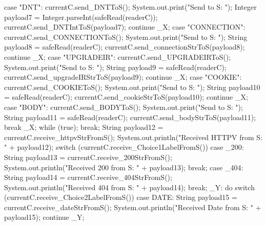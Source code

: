 \begin{code}
{{{{{                        case "DNT":
                            currentC.send_DNTToS();
                            System.out.print("Send to S: ");
                            Integer payload7 = Integer.parseInt(safeRead(readerC));
                            currentC.send_DNTIntToS(payload7);
                            continue _X;
                        case "CONNECTION":
                            currentC.send_CONNECTIONToS();
                            System.out.print("Send to S: ");
                            String payload8 = safeRead(readerC);
                            currentC.send_connectionStrToS(payload8);
                            continue _X;
                        case "UPGRADEIR":
                            currentC.send_UPGRADEIRToS();
                            System.out.print("Send to S: ");
                            String payload9 = safeRead(readerC);
                            currentC.send_upgradeIRStrToS(payload9);
                            continue _X;
                        case "COOKIE":
                            currentC.send_COOKIEToS();
                            System.out.print("Send to S: ");
                            String payload10 = safeRead(readerC);
                            currentC.send_cookieStrToS(payload10);
                            continue _X;
                        case "BODY":
                            currentC.send_BODYToS();
                            System.out.print("Send to S: ");
                            String payload11 = safeRead(readerC);
                            currentC.send_bodyStrToS(payload11);
                            break _X;
                    }
                } while (true);
                break;
        }
        String payload12 = currentC.receive_httpvStrFromS();
        System.out.println("Received HTTPV from S: " + payload12);
        switch (currentC.receive_Choice1LabelFromS()) {
            case _200:
                String payload13 = currentC.receive_200StrFromS();
                System.out.println("Received 200 from S: " + payload13);
                break;
            case _404:
                String payload14 = currentC.receive_404StrFromS();
                System.out.println("Received 404 from S: " + payload14);
                break;
        }
        _Y:
        do {
            switch (currentC.receive_Choice2LabelFromS()) {
                case DATE:
                    String payload15 = currentC.receive_dateStrFromS();
                    System.out.println("Received Date from S: " + payload15);
                    continue _Y;
}}}}
\end{code}
